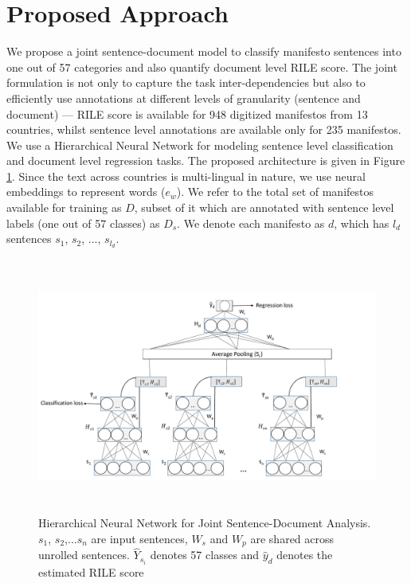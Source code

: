 \documentclass[11pt,a4paper]{article}
\begin{document}
\section{Proposed Approach}
We propose a joint sentence-document model to classify manifesto sentences into one out of 57 categories and also quantify document level RILE score. The joint formulation is not only to capture the task inter-dependencies but also to efficiently use annotations at different levels of granularity (sentence and document) --- RILE score is available for 948 digitized manifestos from 13 countries, whilst sentence level annotations are available only for 235 manifestos. We use a Hierarchical Neural Network for modeling sentence level classification and document level regression tasks. The proposed architecture is given in Figure \ref{fig:HNN}. Since the text across countries is multi-lingual in nature, we use neural embeddings to represent words ($e_{w}$). We refer to the total set of manifestos available for training as $D$, subset of it which are annotated with sentence level labels (one out of 57 classes) as $D_{s}$. We denote each manifesto as $d$, which has $l_{d}$ sentences $s_{1}$, $s_{2}$, ..., $s_{l_{d}}$. 


\begin{figure}[!ht]
\centering
\includegraphics[height=8.4cm, scale=1.4]{ALTA_Model.pdf}
\caption{Hierarchical Neural Network for Joint Sentence-Document Analysis. $s_{1}$, $s_{2}$,...$s_{n}$ are input sentences, $W_{s}$ and $W_{p}$ are shared across unrolled sentences. $\hat{Y}_{s_{i}}$ denotes  57 classes and $\hat{y}_{d}$ denotes the estimated RILE score}
 \label{fig:HNN}
 \end{figure}
\end{document}
